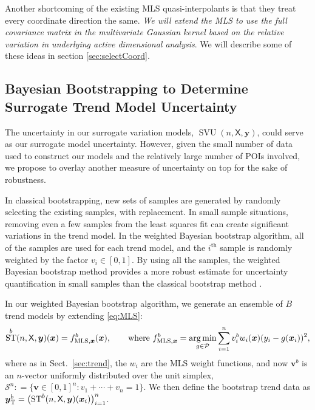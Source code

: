 \documentclass[11pt]{NSFamsart}
\DeclareMathOperator*{\argmin}{arg\,min}
\DeclareMathOperator{\STREND}{ST} %
\DeclareMathOperator{\SVARERR}{SVU} %
\newcommand{\TREND}{\textup{T}}
\newcommand{\LS}{\textup{MLS}}
\newcommand{\mX}{\mathsf{X}}
\newcommand{\bx}{{\boldsymbol{x}}}
\newcommand{\bv}{{\boldsymbol{v}}}
\newcommand{\by}{{\boldsymbol{y}}}
\newcommand{\calp}{{\mathcal{P}}}
\newcommand{\cals}{{\mathcal{S}}}
\begin{document}
Another shortcoming of the existing MLS quasi-interpolants is that they treat every coordinate direction the same. 
\emph{We will extend the MLS to use the full covariance matrix in the multivariate Gaussian kernel based on the relative variation in underlying active dimensional analysis}. We will describe some of these ideas in section \ref{sec:selectCoord}. 


\subsection{Bayesian Bootstrapping to Determine Surrogate Trend Model Uncertainty} \label{sec:BayesianBootUncertainty}
The uncertainty in our surrogate variation models, $\SVARERR(n,\mX,\by)$, could serve as our surrogate model uncertainty. However, given the small number of data used to construct our models and the relatively large number of POIs involved, we propose to overlay another measure of uncertainty on top for the sake of robustness. 

In classical bootstrapping, new sets of samples are generated by randomly selecting the existing samples, with replacement. 
In small sample situations, removing even a few samples from the least squares fit can create significant variations in the trend model. In the weighted Bayesian bootstrap algorithm, all of the samples are used for each trend model, and the $i^{\text{th}}$ sample is randomly weighted by the factor $v_i \in [0,1]$. By using all the samples, the weighted Bayesian bootstrap method provides a more robust estimate for uncertainty quantification in small samples than the classical bootstrap method \cite{rubin1981bayesian, efron1986bootstrap, efron2016computer}. 

In our weighted Bayesian bootstrap algorithm, we generate an ensemble of $B$ trend models by extending \eqref{eq:MLS}:
\begin{equation}
	\STREND^b(n,\mX,\by)(\bx) = f^b_{\LS,\bx}(\bx), \qquad \text{where } f^b_{\LS,\bx} = \argmin_{g \in \calp} \sum_{i=1}^n v_i^b w_i(\bx)(y_i - g(\bx_i))^2,
\end{equation}
where as in Sect.\ \ref{sec:trend}, the $w_i$ are the MLS weight functions, and now $\bv^b$ is an $n$-vector uniformly distributed over the unit simplex, $\cals^n : = \{\bv \in [0,1]^n : v_1 + \cdots + v_n = 1\}$. We then define the bootstrap trend data as $\by^b_{\TREND} = \bigl(\STREND^b(n,\mX,\by)(\bx_i) \bigr)_{i=1}^n$. 
\end{document}
